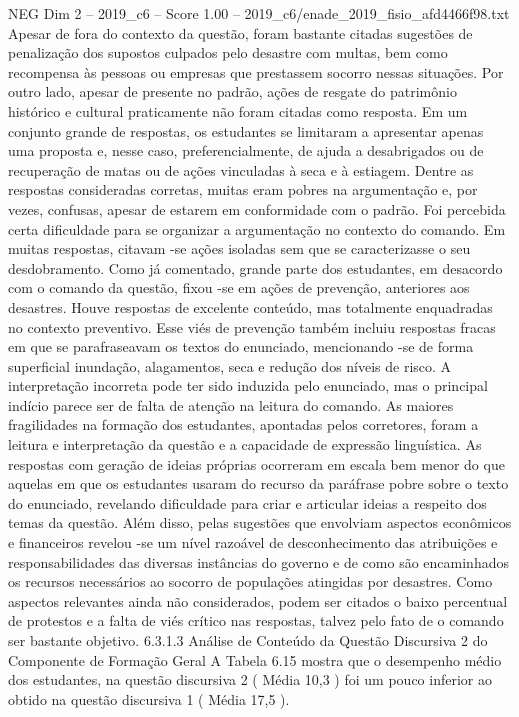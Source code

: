 \begin{textsample}{NEG Dim 2 – 2019\_c6 – Score 1.00 – 2019\_c6/enade\_2019\_fisio\_afd4466f98.txt}
Apesar de fora do contexto da questão, foram bastante citadas sugestões de penalização dos supostos culpados pelo desastre com multas, bem como recompensa às pessoas ou empresas que prestassem socorro nessas situações.
Por outro lado, apesar de presente no padrão, ações de resgate do patrimônio histórico e cultural praticamente não foram citadas como resposta.
Em um conjunto grande de respostas, os estudantes se limitaram a apresentar apenas uma proposta e, nesse caso, preferencialmente, de ajuda a desabrigados ou de recuperação de matas ou de ações vinculadas à seca e à estiagem.
Dentre as respostas consideradas corretas, muitas eram pobres na argumentação e, por vezes, confusas, apesar de estarem em conformidade com o padrão.
Foi percebida certa dificuldade para se organizar a argumentação no contexto do comando.
Em muitas respostas, citavam -se ações isoladas sem que se caracterizasse o seu desdobramento.
Como já comentado, grande parte dos estudantes, em desacordo com o comando da questão, fixou -se em ações de prevenção, anteriores aos desastres.
Houve respostas de excelente conteúdo, mas totalmente enquadradas no contexto preventivo.
Esse viés de prevenção também incluiu respostas fracas em que se parafraseavam os textos do enunciado, mencionando -se de forma superficial inundação, alagamentos, seca e redução dos níveis de risco.
A interpretação incorreta pode ter sido induzida pelo enunciado, mas o principal indício parece ser de falta de atenção na leitura do comando.
As maiores fragilidades na formação dos estudantes, apontadas pelos corretores, foram a leitura e interpretação da questão e a capacidade de expressão linguística.
As respostas com geração de ideias próprias ocorreram em escala bem menor do que aquelas em que os estudantes usaram do recurso da paráfrase pobre sobre o texto do enunciado, revelando dificuldade para criar e articular ideias a respeito dos temas da questão.
Além disso, pelas sugestões que envolviam aspectos econômicos e financeiros revelou -se um nível razoável de desconhecimento das atribuições e responsabilidades das diversas instâncias do governo e de como são encaminhados os recursos necessários ao socorro de populações atingidas por desastres.
Como aspectos relevantes ainda não considerados, podem ser citados o baixo percentual de protestos e a falta de viés crítico nas respostas, talvez pelo fato de o comando ser bastante objetivo. 6.3.1.3 Análise de Conteúdo da Questão Discursiva 2 do Componente de Formação Geral A Tabela 6.15 mostra que o desempenho médio dos estudantes, na questão discursiva 2 ( Média 10,3 ) foi um pouco inferior ao obtido na questão discursiva 1 ( Média 17,5 ).

\end{textsample}
